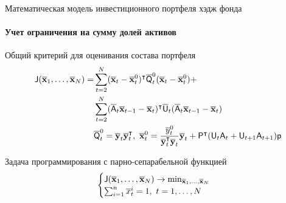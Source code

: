 \documentclass[1pt]{beamer}
\let\T\intercal
\let\ov\overline
\def\bar_#1{\bold{\ov{#1}}}
\def\msf_#1{\mathsf{#1}}
\begin{document}
\begin{frame}{Математическая модель инвестиционного портфеля хэдж фонда}
\framesubtitle{Учет ограничения на сумму долей активов}
\begin{block}{Общий критерий для оценивания состава портфеля}
\begin{align*}
\msf_J(\bar_x_1, \dots, \bar_x_N) =&\sum_{t=2}^N (\bar_x_t - \bar_x_t^0)^\T \overline{\msf_Q}_t^0(\bar_x_t - \bar_x_t^0) + \\&\sum_{t=2}^N (\overline{\msf_A}_t \bar_x_{t-1} - \bar_x_t)^\T \overline{\msf_U}_t (\overline{\msf_A}_t \bar_x_{t-1} - \bar_x_t)\\
&\overline{\msf_Q}_t^0 = \bar_y_t \bar_y_t^\T,\ \bar_x_t^0 = \frac{\overline{y}_t^0}{\bar_y_t^\T \bar_y_t} \bar_y_t + \msf_P^\T(\msf_U_t\msf_A_t + \msf_U_{t+1}\msf_A_{t+1})\msf_p
\end{align*}
\end{block}
\begin{block}{Задача программирования с парно-сепарабельной функцией}
\[\begin{cases}
\msf_J(\bar_x_1, \dots, \bar_x_N)\rightarrow\min_{\bar_x_1,\dots,\bar_x_N}\\
\sum_{i=1}^n \overline{x}_t^i = 1,\ t=1,\dots,N
\end{cases}
\]
\end{block}
\end{frame}
\end{document}

